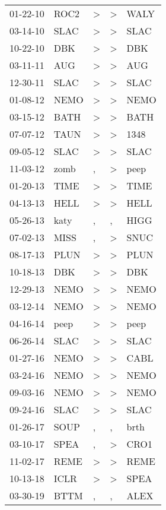 \begin{supertabular}{lllll}
 01-22-10 &  ROC2 &     \textgreater &     \textgreater &   WALY \\
 03-14-10 &  SLAC &     \textgreater &     \textgreater &   SLAC \\
 10-22-10 &   DBK &     \textgreater &     \textgreater &    DBK \\
 03-11-11 &   AUG &     \textgreater &     \textgreater &    AUG \\
 12-30-11 &  SLAC &     \textgreater &     \textgreater &   SLAC \\
 01-08-12 &  NEMO &     \textgreater &     \textgreater &   NEMO \\
 03-15-12 &  BATH &     \textgreater &     \textgreater &   BATH \\
 07-07-12 &  TAUN &     \textgreater &     \textgreater &   1348 \\
 09-05-12 &  SLAC &     \textgreater &     \textgreater &   SLAC \\
 11-03-12 &  zomb &                , &     \textgreater &   peep \\
 01-20-13 &  TIME &     \textgreater &     \textgreater &   TIME \\
 04-13-13 &  HELL &     \textgreater &     \textgreater &   HELL \\
 05-26-13 &  katy &                , &                , &   HIGG \\
 07-02-13 &  MISS &                , &     \textgreater &   SNUC \\
 08-17-13 &  PLUN &     \textgreater &     \textgreater &   PLUN \\
 10-18-13 &   DBK &     \textgreater &     \textgreater &    DBK \\
 12-29-13 &  NEMO &     \textgreater &     \textgreater &   NEMO \\
 03-12-14 &  NEMO &     \textgreater &     \textgreater &   NEMO \\
 04-16-14 &  peep &     \textgreater &     \textgreater &   peep \\
 06-26-14 &  SLAC &     \textgreater &     \textgreater &   SLAC \\
 01-27-16 &  NEMO &     \textgreater &     \textgreater &   CABL \\
 03-24-16 &  NEMO &     \textgreater &     \textgreater &   NEMO \\
 09-03-16 &  NEMO &     \textgreater &     \textgreater &   NEMO \\
 09-24-16 &  SLAC &     \textgreater &     \textgreater &   SLAC \\
 01-26-17 &  SOUP &                , &                , &   brth \\
 03-10-17 &  SPEA &                , &     \textgreater &   CRO1 \\
 11-02-17 &  REME &     \textgreater &     \textgreater &   REME \\
 10-13-18 &  ICLR &     \textgreater &     \textgreater &   SPEA \\
 03-30-19 &  BTTM &                , &                , &   ALEX \\
\end{supertabular}
